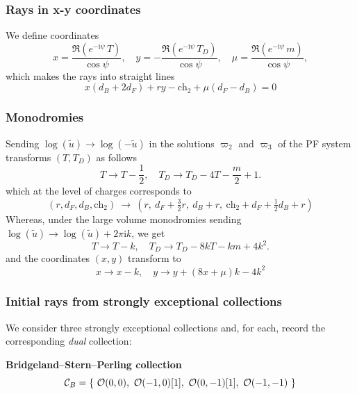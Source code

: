 \documentclass[11pt, a4paper]{article}
\newcommand{\ii}{\mathrm{i}}
\newcommand{\ch}{\mathrm{ch}}
\newcommand{\chO}{\mathcal{O}}
\numberwithin{equation}{section}
\begin{document}
\subsubsection{Rays in x-y coordinates}

We define coordinates
\begin{equation}\label{eq:xydef}
  x = \frac{\Re(e^{-\ii \psi} \, T)}{\cos \psi}, \quad y = -\frac{\Re(e^{-\ii \psi} \, T_D)}{\cos \psi}, \quad \mu = \frac{\Re(e^{-\ii \psi} \, m)}{\cos \psi},
\end{equation}
which makes the rays into straight lines
\begin{equation}
  x (d_B+2 d_F)+r y -\ch_2+\mu (d_F-d_B) = 0
\end{equation}

\subsubsection{Monodromies}

Sending $\log(\tilde{u}) \to \log(-\tilde{u})$ in the solutions $\varpi_2$ and $\varpi_3$ of the PF system transforms $(T, T_D)$ as follows
\begin{equation}
  T \to T - \frac{1}{2}, \quad T_D \to T_D - 4T -\frac{m}{2}+1.
\end{equation}
which at the level of charges corresponds to
\begin{equation}
  (r, d_F, d_B, \ch_2) \ \rightarrow \ \left( r, \ d_F + \tfrac32 r, \ d_B + r, \ \ch_2 + d_F + \tfrac12 d_B + r \right)
\end{equation}
Whereas, under the large volume monodromies sending $\log(\tilde{u}) \to \log(\tilde{u})+ 2 \pi \ii k$, we get
\begin{equation}
  T \to T - k, \quad T_D \to T_D - 8 k T - k m + 4 k^2.
\end{equation}
and the coordinates $(x, y)$ transform to
\begin{equation}
  x \to x - k, \quad y \to y + (8 x + \mu) k - 4k^2
\end{equation}


\subsubsection{Initial rays from strongly exceptional collections}

We consider three strongly exceptional collections and, for each, record the corresponding \emph{dual} collection:
\medskip

\noindent\textbf{Bridgeland--Stern--Perling collection}
\begin{equation}
  \mathcal{C}_B
  = \qty{\ \chO(0,0),\ \chO(-1,0)[1],\ \chO(0,-1)[1],\ \chO(-1,-1)\ }
\end{equation}
\end{document}
